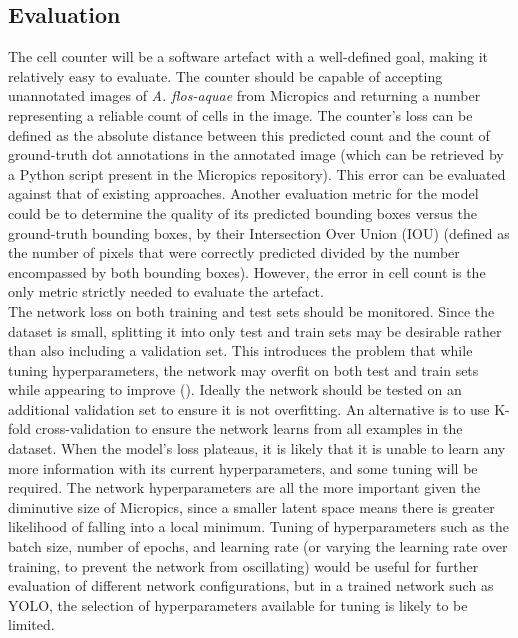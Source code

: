 \subsection{Evaluation}
The cell counter will be a software artefact with a well-defined goal, making it relatively easy to evaluate. The counter should be capable of accepting unannotated images of \textit{A. flos-aquae} from Micropics and returning a number representing a reliable count of cells in the image. The counter's loss can be defined as the absolute distance between this predicted count and the count of ground-truth dot annotations in the annotated image (which can be retrieved by a Python script present in the Micropics repository). This error can be evaluated against that of existing approaches. Another evaluation metric for the model could be to determine the quality of its predicted bounding boxes versus the ground-truth bounding boxes, by their Intersection Over Union (IOU) (defined as the number of pixels that were correctly predicted divided by the number encompassed by both bounding boxes). However, the error in cell count is the only metric strictly needed to evaluate the artefact.\\

The network loss on both training and test sets should be monitored. Since the dataset is small, splitting it into only test and train sets may be desirable rather than also including a validation set. This introduces the problem that while tuning hyperparameters, the network may overfit on both test and train sets while appearing to improve (\cite{zhang2017understanding}). Ideally the network should be tested on an additional validation set to ensure it is not overfitting. An alternative is to use K-fold cross-validation to ensure the network learns from all examples in the dataset. When the model's loss plateaus, it is likely that it is unable to learn any more information with its current hyperparameters, and some tuning will be required. The network hyperparameters are all the more important given the diminutive size of Micropics, since a smaller latent space means there is greater likelihood of falling into a local minimum. Tuning of hyperparameters such as the batch size, number of epochs, and learning rate (or varying the learning rate over training, to prevent the network from oscillating) would be useful for further evaluation of different network configurations, but in a trained network such as YOLO, the selection of hyperparameters available for tuning is likely to be limited.